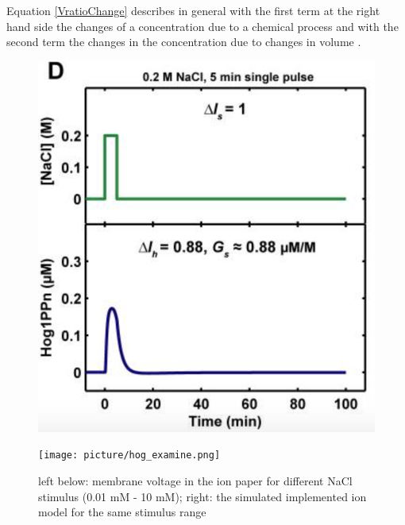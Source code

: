 Equation \ref{VratioChange} describes in general  with the first term at the right hand side the changes of a concentration due to a chemical process and with the second term the changes in the concentration due to changes in volume \cite{Ke_2013}.\\

\begin{figure}[htbp]
	
	\begin{minipage}{0,5\textwidth}
		
		\includegraphics[width=\textwidth]{picture/Hog_Paper.png}
		
		\label{IonPaddper} 
	\end{minipage}
	\begin{minipage}{0,5\textwidth}
		
		\texttt{[image: picture/hog\_examine.png]}
		
		\label{IonImpdlemented} 
	\end{minipage}
	\caption{left below: membrane voltage in the ion paper for different NaCl stimulus (0.01 mM - 10 mM); right: the simulated implemented ion model for the same stimulus range }
\end{figure}

